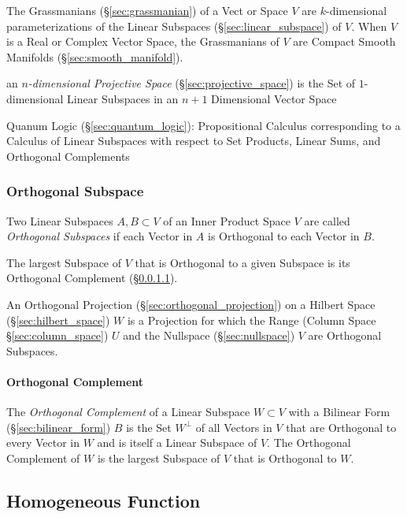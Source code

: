 The Grassmanians (\S\ref{sec:grassmanian}) of a Vect or Space $V$ are
$k$-dimensional parameterizations of the Linear Subspaces
(\S\ref{sec:linear_subspace}) of $V$. When $V$ is a Real or Complex Vector
Space, the Grassmanians of $V$ are Compact Smooth Manifolds
(\S\ref{sec:smooth_manifold}).

\fist an \emph{$n$-dimensional Projective Space} (\S\ref{sec:projective_space})
is the Set of $1$-dimensional Linear Subspaces in an $n+1$ Dimensional Vector
Space

\fist Quanum Logic (\S\ref{sec:quantum_logic}): Propositional Calculus
corresponding to a Calculus of Linear Subspaces with respect to Set Products,
Linear Sums, and Orthogonal Complements



\subsubsection{Orthogonal Subspace}\label{sec:orthogonal_subspace}

Two Linear Subspaces $A, B \subset V$ of an Inner Product Space $V$ are called
\emph{Orthogonal Subspaces} if each Vector in $A$ is Orthogonal to each Vector
in $B$.

The largest Subspace of $V$ that is Orthogonal to a given Subspace is its
Orthogonal Complement (\S\ref{sec:orthogonal_complement}).

An Orthogonal Projection (\S\ref{sec:orthogonal_projection}) on a Hilbert Space
(\S\ref{sec:hilbert_space}) $W$ is a Projection for which the Range (Column
Space \S\ref{sec:column_space}) $U$ and the Nullspace (\S\ref{sec:nullspace})
$V$ are Orthogonal Subspaces.



\paragraph{Orthogonal Complement}\label{sec:orthogonal_complement}\hfill

The \emph{Orthogonal Complement} of a Linear Subspace $W \subset V$ with a
Bilinear Form (\S\ref{sec:bilinear_form}) $B$ is the Set $W^\bot$ of all
Vectors in $V$ that are Orthogonal to every Vector in $W$ and is itself a
Linear Subspace of $V$. The Orthogonal Complement of $W$ is the largest
Subspace of $V$ that is Orthogonal to $W$.



\subsection{Homogeneous Function}\label{sec:homogeneous_function}

